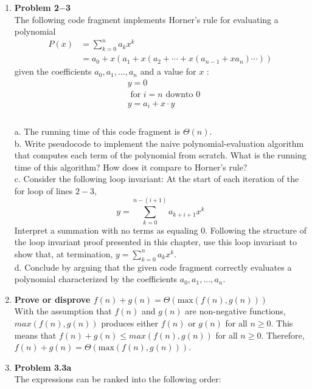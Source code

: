 \documentclass[a4paper,11pt,oneside]{book}
\begin{document}
\begin{enumerate}
  \item {\textbf{Problem 2$-$3}} 
  \\ The following code fragment implements Horner's rule for evaluating a polynomial
  $$
  \begin{aligned}
  P(x) & =\sum_{k=0}^n a_k x^k \\
  & =a_0+x\left(a_1+x\left(a_2+\cdots+x\left(a_{n-1}+x a_n\right) \cdots\right)\right)
  \end{aligned}
  $$
  given the coefficients $a_0, a_1, \ldots, a_n$ and a value for $x$ :
  $$
  \begin{aligned}
  & y=0 \\
  & \text { for } i=n \text { downto } 0 \\
  & y=a_i+x \cdot y \\
  &
  \end{aligned}
  $$
  \\ a. The running time of this code fragment is $\Theta(n)$.
  \\ b. Write pseudocode to implement the naive polynomial-evaluation algorithm that computes each term of the polynomial from scratch. What is the running time of this algorithm? How does it compare to Horner's rule?
  \\ c. Consider the following loop invariant:
  At the start of each iteration of the for loop of lines $2-3$,
  $$
  y=\sum_{k=0}^{n-(i+1)} a_{k+i+1} x^k
  $$
  Interpret a summation with no terms as equaling 0. Following the structure of the loop invariant proof presented in this chapter, use this loop invariant to show that, at termination, $y=\sum_{k=0}^n a_k x^k$.
  \\ d. Conclude by arguing that the given code fragment correctly evaluates a polynomial characterized by the coefficients $a_0, a_1, \ldots, a_n$.
  
  \item {\textbf{Prove or disprove $f(n) + g(n) = \Theta(\text{max}(f(n), g(n)))$}}
  \\ With the assumption that $f(n)$ and $g(n)$ are non-negative functions, $max(f(n), g(n))$ produces either 
  $f(n)$ or $g(n)$ for all $n \geq0$. This means that $f(n) + g(n) \leq max(f(n), g(n))$ for all $n \geq 0$. Therefore, $f(n) + g(n) = \Theta(\text{max}(f(n), g(n)))$.

  \item {\textbf{Problem 3.3a}} 
  \\ The expressions can be ranked into the following order: 


\end{enumerate}
\end{document}
